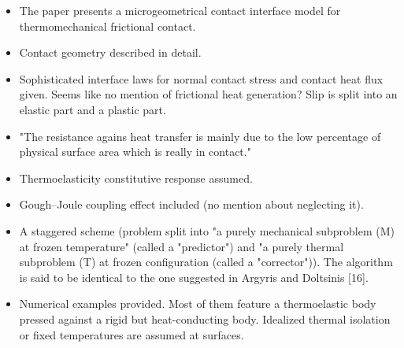 \documentclass{article}
\begin{document}
\begin{itemize}
\item The paper presents a microgeometrical contact interface model for thermomechanical frictional contact.
\item Contact geometry described in detail.
\item Sophisticated interface laws for normal contact stress and contact heat flux given. Seems like no mention of frictional heat generation? Slip is split into an elastic part and a plastic part.
\item "The resistance agains heat transfer is mainly due to the low percentage of physical surface area which is really in contact."
\item Thermoelasticity constitutive response assumed.
\item Gough--Joule coupling effect included (no mention about neglecting it).
\item A staggered scheme (problem split into "a purely mechanical subproblem (M) at frozen temperature" (called a "predictor") and "a purely thermal subproblem (T) at frozen configuration (called a "corrector")). The algorithm is said to be identical to the one suggested in Argyris and Doltsinis [16].
\item Numerical examples provided. Most of them feature a thermoelastic body pressed against a rigid but heat-conducting body. Idealized thermal isolation or fixed temperatures are assumed at surfaces.
\end{itemize}
\end{document}
